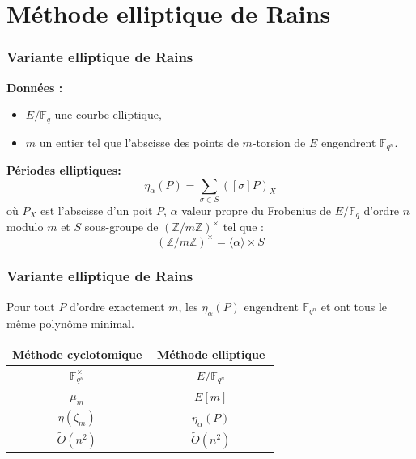 \documentclass{beamer} %
\numberwithin{equation}{section}
\newcommand\zmodninv[1]{(\mathbb{Z}/#1\mathbb{Z})^{\times}}
\newcommand\GF[1]{\mathbb{F}_{#1}}
\newcommand\tO[1]{\widetilde{O}(#1)}
\newcommand\groupgen[1]{\langle{#1}\rangle}
\begin{document}
\section{Méthode elliptique de Rains}
\begin{frame}
\frametitle{Variante elliptique de Rains}
\textbf{Données :}
\begin{itemize}
	\item $E/\GF{q}$ une courbe elliptique,
	\item $m$ un entier tel que l'abscisse des points de $m$-torsion de $E$
engendrent $\GF{q^n}$.
\end{itemize}
\vspace{0.3cm}
\textbf{Périodes elliptiques: }\\
\[\eta_{\alpha}(P)=\sum_{\sigma\in S}{([\sigma]P)_X}\]
où $P_X$ est l'abscisse d'un poit $P$, $\alpha$ valeur propre du Frobenius de
$E/\GF{q}$ d'ordre $n$ modulo $m$ et $S$ sous-groupe de $\zmodninv{m}$ tel que :
\[\zmodninv{m} = \groupgen{\alpha}\times S\]
\end{frame}
\begin{frame}
\frametitle{Variante elliptique de Rains}
\begin{framed}
\begin{conj}
Pour tout $P$ d'ordre exactement $m$, les $\eta_{\alpha}(P)$ engendrent 
$\GF{q^n}$ et ont tous le même polynôme minimal.
\end{conj}
\end{framed}
\begin{table}
\begin{tabular}{|c|c|}
\hline
Méthode cyclotomique & $\,$$\,$Méthode elliptique$\,$$\,$\\
\hline
\hline
$\GF{q^n}^{\times}$ & $E/\GF{q^n}$\\
\hline
$\mu_m$ & $E[m]$\\
\hline
$\eta(\zeta_m)$ & $\eta_{\alpha}(P)$\\
\hline
$\tO{n^2}$ & $\tO{n^2}$\\
\hline
\end{tabular}
\end{table}
\end{frame}
\end{document}
